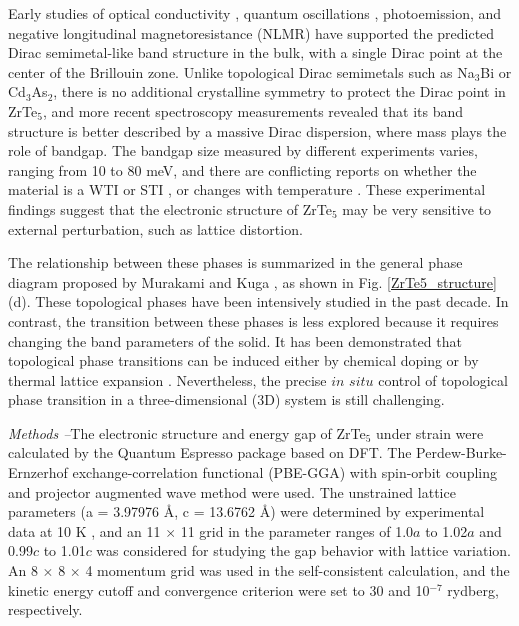 Early studies of optical conductivity \cite{chen2015optical}, quantum oscillations \cite{liu2016zeeman, nair2018thermodynamic}, photoemission, and negative longitudinal magnetoresistance
(NLMR) \cite{li2016chiral} have supported the predicted Dirac semimetal-like band structure in the bulk, with a single Dirac point at the center of the Brillouin zone. Unlike topological Dirac semimetals such as Na$_3$Bi or Cd$_3$As$_2$, there is no additional crystalline symmetry to protect the Dirac point in ZrTe$_5$, and more recent spectroscopy measurements revealed that its band structure is better described by a massive Dirac dispersion, where mass plays the role of bandgap. The bandgap size measured by different experiments varies, ranging from 10 to 80 meV, and there are conflicting reports on whether the material is a WTI or STI \cite{li2016experimental, chen2017spectroscopic, jiang2017landau, xiong2017three}, or changes with temperature \cite{xu2018temperature}. These experimental findings suggest that the electronic structure of ZrTe$_5$ may be very sensitive to external perturbation, such as lattice distortion.

The relationship between these phases is summarized in the general phase diagram proposed by Murakami and Kuga \cite{murakami2008universal, murakami2007phase}, as shown in Fig. \ref{ZrTe5_structure} (d). These topological phases have been intensively studied in the past decade. In contrast, the transition between these phases is less explored because it requires changing the band parameters of the solid. It has been demonstrated that topological phase transitions can be induced either by chemical doping or by thermal lattice expansion \cite{xu2011topological, wu2013sudden, dziawa2012topological, xu2012observation}. Nevertheless, the precise $in$ $situ$ control of topological phase transition in a three-dimensional (3D) system is still challenging. 


{\it Methods --}The electronic structure and energy gap of ZrTe$_5$ under strain were calculated by the Quantum Espresso package \cite{giannozzi2009quantum} based on DFT. The Perdew-Burke-Ernzerhof exchange-correlation functional (PBE-GGA) \cite{PBE} with spin-orbit coupling and projector augmented wave \cite{PAW_1} method were used. The unstrained lattice parameters (a = 3.97976 Å, c = 13.6762 Å) were determined by experimental data at 10 K \cite{fjellvaag1986structural}, and an 11 $\times$ 11 grid in the parameter ranges of 1.0$a$ to 1.02$a$ and 0.99$c$ to 1.01$c$ was considered for studying the gap behavior with lattice variation. An 8 $\times$ 8 $\times$ 4 momentum grid was used in the self-consistent calculation, and the kinetic energy cutoff and convergence criterion were set to 30 and 10$^{-7}$ rydberg, respectively.


